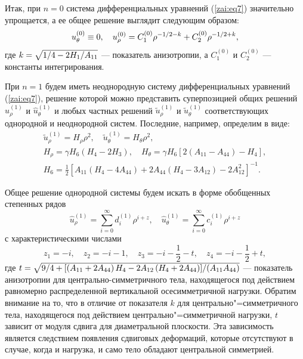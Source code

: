 Итак, при $n = 0$ система дифференциальных уравнений (\ref{zai:eq7})
значительно упрощается, а ее общее решение выглядит следующим
образом:
$$
u^{(0)}_{\theta} \equiv 0, \quad u_\rho ^{\left( 0
\right)} = C_1^{(0)} \rho ^{ - 1 \mathord{\left/
{\vphantom {1 2}} \right. \kern-\nulldelimiterspace} 2 - k} +
C_2^{(0)} \rho ^{ - 1 \mathord{\left/ {\vphantom {1 2}}
\right. \kern-\nulldelimiterspace} 2 + k} ,
$$
\noindent где $k = \sqrt {1 \mathord{\left/ {\vphantom {1 4}}
\right. \kern-\nulldelimiterspace} 4 - 2{H_{1}} \mathord{\left/
{\vphantom {{H_{1}} {A_{11} }}} \right. \kern-\nulldelimiterspace}
{A_{11} }} $ --- показатель анизотропии, а $C^{(0)}_{1}
$ и $C^{(0)}_{2} $ --- константы интегрирования.

При $n = 1$ будем иметь неоднородную систему дифференциальных
уравнений (\ref{zai:eq7}), решение которой можно представить
суперпозицией общих решений $\hat{u}^{(1)}_{\rho}$ и
$\hat{u}^{(1)}_{\theta}$  и
любых частных решений $\tilde{u}^{(1)}_{\rho}$ и
$\tilde{u}^{(1)}_{\theta}$ соответствующих однородной и неоднородной систем.
Последние, например, определим в виде:
\begin{gather*}
\tilde{u}^{(1)}_{\rho} = H_\rho \rho^2, \quad
\tilde{u}^{(1)}_{\theta} = H_\theta \rho^2,
\\
H_\rho = \gamma H_6 \left( {H_4 - 2H_3 } \right), \quad H_\theta =
\gamma H_6 \left[ {2\left( {A_{11} - A_{44} } \right) - H_4 }
\right],
\\
H_6 = \frac{1}{2}\left[ {A_{11} \left( {H_4 - 4A_{44} } \right) +
2A_{44} \left( {H_4 - 3A_{12} } \right) - 2A_{12}^2 } \right]^{ -
1}.
\end{gather*}

Общее решение однородной системы будем искать в форме обобщенных
степенных рядов
$$
\hat {u}_\rho ^{(1)} = \sum\limits_{i = 0}^\infty
{d_i^{(1)} \rho ^{i + z}} , \quad \hat {u}_\theta
^{(1)} = \sum\limits_{i = 0}^\infty {c_i^{\left( 1
\right)} \rho ^{i + z}}
$$
\noindent с характеристическими числами
$$
z_1 = - i, \quad z_2 = - i - 1, \quad z_3 = - i - \frac{1}{2} - t,
\quad z_4 = - i - \frac{1}{2} + t,
$$
\noindent где $t = \sqrt {9 \mathord{\left/ {\vphantom {9 4}}
\right. \kern-\nulldelimiterspace} 4 + {\left[ {\left( {A_{11} +
2A_{44} } \right) H_4 - 2A_{12} \left( {H_4 + 2A_{44} } \right)}
\right]} \mathord{\left/ {\vphantom {{\left[ {\left( {A_{11} +
2A_{44} } \right)\left( {A_{22} + A_{23} } \right) - 2A_{12} \left(
{A_{12} + 3A_{44} } \right)} \right]} {\left( {A_{11} A_{44} }
\right)}}} \right. \kern-\nulldelimiterspace} {\left( {A_{11} A_{44}
} \right)}} $ --- показатель анизотропии для
центрально-симметричного тела, находящегося под действием равномерно
распределенной вертикальной осесимметричной нагрузки. Обратим
внимание на то, что в отличие от показателя $k$ для
центрально"=симметричного тела, находящегося под действием
центрально"=симметричной нагрузки, $t$ зависит от модуля
сдвига для диаметральной плоскости. Эта зависимость является
следствием появления сдвиговых деформаций, которые отсутствуют в
случае, когда и нагрузка, и само тело обладают центральной
симметрией.

